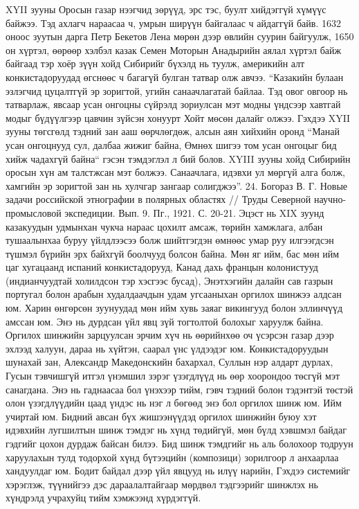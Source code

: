 XYII зууны Оросын газар нээгчид зөрүүд, эрс тэс, буулт хийдэггүй хүмүүс байжээ. Тэд ахлагч нараасаа ч, умрын ширүүн байгалаас ч айдаггүй байв. 1632 оноос зуутын дарга Петр Бекетов Лена мөрөн дээр өвлийн суурин байгуулж, 1650 он хүртэл, өөрөөр хэлбэл казак Семен Моторын Анадырийн аялал хүртэл байж байгаад тэр хоёр зүүн хойд Сибирийг бүхэлд нь туулж, америкийн алт конкистадоруудад өгснөөс ч багагүй булган татвар олж авчээ. “Казакийн булаан эзлэгчид цуцалтгүй эр зоригтой, угийн санаачлагатай байлаа. Тэд овог овгоор нь татварлаж, явсаар усан онгоцны сүйрэлд зориулсан мэт модны үндсээр хавтгай модыг бүдүүлгээр цавчин зүйсэн хонуурт Хойт мөсөн далайг олжээ. Гэхдээ XYII зууны төгсгөлд тэдний зан ааш өөрчлөгдөж, алсын аян хийхийн оронд “Манай усан онгоцнууд сул, далбаа жижиг байна, Өмнөх шигээ том усан онгоцыг бид хийж чадахгүй байна“ гэсэн тэмдэглэл л бий болов. XYIII зууны хойд Сибирийн оросын хүн ам талстжсан мэт болжээ. Санаачлага, идэвхи ул мөргүй алга болж, хамгийн эр зоригтой зан нь хулчгар зангаар солигджээ”. 24. Богораз В. Г. Новые задачи российской этнографии в полярных областях // Труды Северной научно-промысловой экспедиции. Вып. 9. Пг., 1921. С. 20-21.
Эцэст нь XIX зуунд казакуудын удмынхан чукча нараас цохилт амсаж, төрийн хамжлага, албан тушаалынхаа буруу үйлдлээсээ болж шийтгэгдэн өмнөөс умар руу илгээгдсэн түшмэл бүрийн эрх байхгүй боолчууд болсон байна. Мөн яг ийм, бас мөн ийм цаг хугацаанд испаний конкистадорууд, Канад дахь францын колонистууд (индианчуудтай холилдсон тэр хэсгээс бусад), Энэтхэгийн далайн сав газрын португал болон арабын худалдаачдын удам угсааныхан оргилох шинжээ алдсан юм. Харин өнгөрсөн зуунуудад мөн ийм хувь заяаг викингууд болон эллинчүүд амссан юм. Энэ нь дурдсан үйл явц зүй тогтолтой болохыг харуулж байна. Оргилох шинжийн зарцуулсан эрчим хүч нь өөрийнхөө оч үсэрсэн газар дээр эхлээд халуун, дараа нь хүйтэн, саарал үнс үлдээдэг юм.
Конкистадоруудын шунахай зан, Александр Македонскийн бахархал, Суллын нэр алдарт дурлах, Гусын тэвчишгүй итгэл үнэмшил зэрэг үзэгдлүүд нь өөр хоорондоо төсгүй мэт санагдана. Энэ нь гаднаасаа бол үнэхээр тийм, гэвч тэдний болон тэдэнтэй төстэй олон үзэгдлүүдийн цаад үндэс нь нэг л бөгөөд энэ бол оргилох шинж юм. Ийм учиртай юм. Бидний авсан бүх жишээнүүдэд оргилох шинжийн буюу хэт идэвхийн лугшилтын шинж тэмдэг нь хүнд төдийгүй, мөн бүлд хэвшмэл байдаг гэдгийг цохон дурдаж байсан билээ. Бид шинж тэмдгийг нь аль болохоор тодруун харуулахын тулд тодорхой хүнд бүтээцийн (композици) зорилгоор л анхаарлаа хандуулдаг юм. Бодит байдал дээр үйл явцууд нь илүү нарийн, Гэхдээ системийг хэрэглэж, түүнийгээ дэс дараалалтайгаар мөрдвөл тэдгээрийг шинжлэх нь хүндрэлд учрахуйц тийм хэмжээнд хүрдэггүй.
